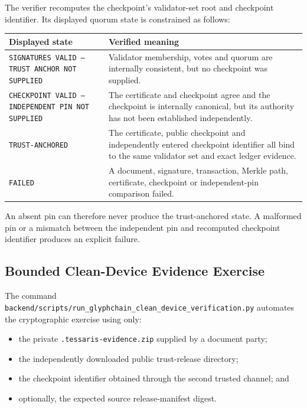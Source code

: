 The verifier recomputes the checkpoint's validator-set root and checkpoint
identifier.  Its displayed quorum state is constrained as follows:

\begin{center}
\begin{tabularx}{\textwidth}{@{}lX@{}}
\toprule
\textbf{Displayed state} & \textbf{Verified meaning} \\
\midrule
\texttt{SIGNATURES VALID -- TRUST ANCHOR NOT SUPPLIED} & Validator membership,
votes and quorum are internally consistent, but no checkpoint was supplied. \\
\texttt{CHECKPOINT VALID -- INDEPENDENT PIN NOT SUPPLIED} & The certificate and
checkpoint agree and the checkpoint is internally canonical, but its authority
has not been established independently. \\
\texttt{TRUST-ANCHORED} & The certificate, public checkpoint and independently
entered checkpoint identifier all bind to the same validator set and exact
ledger evidence. \\
\texttt{FAILED} & A document, signature, transaction, Merkle path, certificate,
checkpoint or independent-pin comparison failed. \\
\bottomrule
\end{tabularx}
\end{center}

An absent pin can therefore never produce the trust-anchored state.  A malformed
pin or a mismatch between the independent pin and recomputed checkpoint
identifier produces an explicit failure.

\subsection{Bounded Clean-Device Evidence Exercise}

The command
\texttt{backend/scripts/run\_glyphchain\_clean\_device\_verification.py}
automates the cryptographic exercise using only:

\begin{itemize}[leftmargin=*]
  \item the private \texttt{.tessaris-evidence.zip} supplied by a document party;
  \item the independently downloaded public trust-release directory;
  \item the checkpoint identifier obtained through the second trusted channel;
        and
  \item optionally, the expected source release-manifest digest.
\end{itemize}

